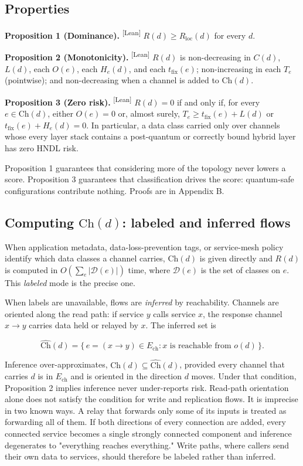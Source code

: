 \documentclass[conference]{IEEEtran}
\newcommand{\tfix}{t_{\mathrm{fix}}}
\newcommand{\Ch}{\mathrm{Ch}}
\newcommand{\leantag}{\textsuperscript{\textsf{\scriptsize[Lean]}}}
\newenvironment{envblock}{\par\smallskip\noindent\ignorespaces}{\par\smallskip}
\begin{document}
\subsection{Properties}\label{sec:6.3}

\begin{envblock}

\textbf{Proposition 1 (Dominance).} \leantag{} $R(d) \ge R_{\mathrm{loc}}(d)$ for every $d$.

\textbf{Proposition 2 (Monotonicity).} \leantag{} $R(d)$ is non-decreasing in $C(d)$, $L(d)$, each $O(e)$, each $H_e(d)$, and each $\tfix(e)$; non-increasing in each $T_e$ (pointwise); and non-decreasing when a channel is added to $\Ch(d)$.

\textbf{Proposition 3 (Zero risk).} \leantag{} $R(d) = 0$ if and only if, for every $e \in \Ch(d)$, either $O(e) = 0$ or, almost surely, $T_e \ge \tfix(e) + L(d)$ or $\tfix(e) + H_e(d) = 0$. In particular, a data class carried only over channels whose every layer stack contains a post-quantum or correctly bound hybrid layer has zero HNDL risk.
\end{envblock}

Proposition 1 guarantees that considering more of the topology never lowers a score. Proposition 3 guarantees that classification drives the score: quantum-safe configurations contribute nothing. Proofs are in Appendix B.

\subsection{Computing $\Ch(d)$: labeled and inferred flows}\label{sec:6.4}

When application metadata, data-loss-prevention tags, or service-mesh policy identify which data classes a channel carries, $\Ch(d)$ is given directly and $R(d)$ is computed in $O(\sum_e |\mathcal{D}(e)|)$ time, where $\mathcal{D}(e)$ is the set of classes on $e$. This \emph{labeled} mode is the precise one.

When labels are unavailable, flows are \emph{inferred} by reachability. Channels are oriented along the read path: if service $y$ calls service $x$, the response channel $x \to y$ carries data held or relayed by $x$. The inferred set is

\[ \widehat{\Ch}(d) = \{\, e = (x \to y) \in E_{\mathrm{ch}} : x \text{ is reachable from } o(d) \,\}. \]

Inference over-approximates, $\Ch(d) \subseteq \widehat{\Ch}(d)$, provided every channel that carries $d$ is in $E_{\mathrm{ch}}$ and is oriented in the direction $d$ moves. Under that condition, Proposition 2 implies inference never under-reports risk. Read-path orientation alone does not satisfy the condition for write and replication flows. It is imprecise in two known ways. A relay that forwards only some of its inputs is treated as forwarding all of them. If both directions of every connection are added, every connected service becomes a single strongly connected component and inference degenerates to "everything reaches everything." Write paths, where callers send their own data to services, should therefore be labeled rather than inferred.
\end{document}
